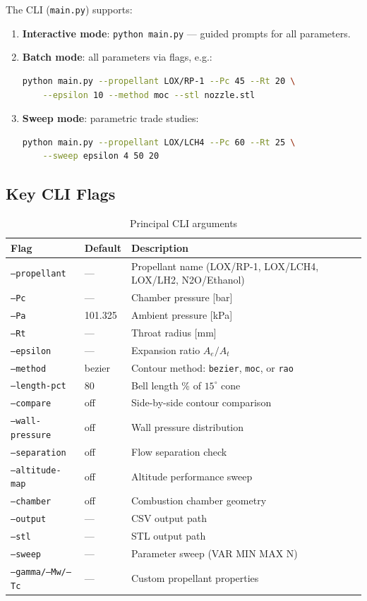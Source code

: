 \documentclass[11pt,a4paper]{article}
\begin{document}
The CLI (\texttt{main.py}) supports:

\begin{enumerate}
\item \textbf{Interactive mode}: \texttt{python main.py} --- guided prompts for all parameters.
\item \textbf{Batch mode}: all parameters via flags, e.g.:
\begin{lstlisting}[language=bash]
python main.py --propellant LOX/RP-1 --Pc 45 --Rt 20 \
    --epsilon 10 --method moc --stl nozzle.stl
\end{lstlisting}
\item \textbf{Sweep mode}: parametric trade studies:
\begin{lstlisting}[language=bash]
python main.py --propellant LOX/LCH4 --Pc 60 --Rt 25 \
    --sweep epsilon 4 50 20
\end{lstlisting}
\end{enumerate}

\subsection{Key CLI Flags}

\begin{table}[H]
\centering\small
\caption{Principal CLI arguments}
\begin{tabular}{@{}llp{6.5cm}@{}}
\toprule
\textbf{Flag} & \textbf{Default} & \textbf{Description} \\
\midrule
\texttt{--propellant} & --- & Propellant name (LOX/RP-1, LOX/LCH4, LOX/LH2, N2O/Ethanol) \\
\texttt{--Pc} & --- & Chamber pressure [bar] \\
\texttt{--Pa} & 101.325 & Ambient pressure [kPa] \\
\texttt{--Rt} & --- & Throat radius [mm] \\
\texttt{--epsilon} & --- & Expansion ratio $A_e/A_t$ \\
\texttt{--method} & bezier & Contour method: \texttt{bezier}, \texttt{moc}, or \texttt{rao} \\
\texttt{--length-pct} & 80 & Bell length \% of $15^\circ$ cone \\
\texttt{--compare} & off & Side-by-side contour comparison \\
\texttt{--wall-pressure} & off & Wall pressure distribution \\
\texttt{--separation} & off & Flow separation check \\
\texttt{--altitude-map} & off & Altitude performance sweep \\
\texttt{--chamber} & off & Combustion chamber geometry \\
\texttt{--output} & --- & CSV output path \\
\texttt{--stl} & --- & STL output path \\
\texttt{--sweep} & --- & Parameter sweep (VAR MIN MAX N) \\
\texttt{--gamma/--Mw/--Tc} & --- & Custom propellant properties \\
\bottomrule
\end{tabular}
\end{table}
\end{document}
